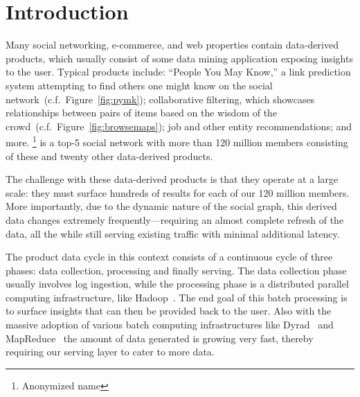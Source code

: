 \section{Introduction}
\label{sec:introduction}

Many social networking, e-commerce, and web properties contain
data-derived products, which usually consist of some data mining
application exposing insights to the user. Typical products include:
``People You May Know,'' a link prediction system attempting to find
others one might know on the social
network~(c.f.~Figure~\ref{fig:pymk}); collaborative filtering, which
showcases relationships between pairs of items based on the wisdom of
the crowd~(c.f.~Figure~\ref{fig:browsemaps}); job and other entity
recommendations; and more. \linkedin\footnote{Anonymized name} is a
top-5 social network with more than 120 million members consisting of
these and twenty other data-derived products. 

The challenge with these data-derived products is that they operate at
a large scale: they must surface hundreds of results for each of our
120 million members. More importantly, due to the dynamic nature of
the social graph, this derived data changes extremely
frequently---requiring an almost complete refresh of the data, all the
while still serving existing traffic with minimal additional latency.

The product data cycle in this context consists of a continuous cycle
of three phases: data collection, processing and finally serving. The
data collection phase usually involves log ingestion, while the
processing phase is a distributed parallel computing infrastructure,
like Hadoop~\cite{hadoop}. The end goal of this batch processing is to surface
insights that can then be provided back to the user. Also with the 
massive adoption of various batch computing infrastructures like 
Dyrad~\cite{dyrad} and MapReduce~\cite{dean} the amount of data generated 
is growing very fast, thereby requiring our serving layer to cater 
to more data. 


